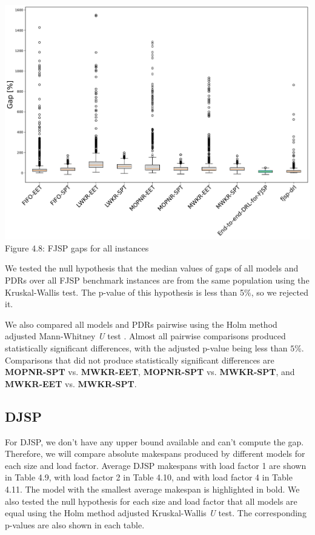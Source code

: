 \begin{center}
    \includegraphics[width=0.9\linewidth]{images/horizontal_boxplot_fjsp_all.pdf}\\
    Figure 4.8: FJSP gaps for all instances
\end{center}

We tested the null hypothesis that the median values of gaps of all models and PDRs over all FJSP benchmark instances are from the same population using the Kruskal-Wallis test. The p-value of this hypothesis is less than 5$\%$, so we rejected it. 
\par
We also compared all models and PDRs pairwise using the Holm method adjusted Mann-Whitney \textit{U} test \cite{mannwhitneyutest}. Almost all pairwise comparisons produced statistically significant differences, with the adjusted p-value being less than $5\%$. Comparisons that did not produce statistically significant differences are \textbf{MOPNR-SPT} vs. \textbf{MWKR-EET}, \textbf{MOPNR-SPT} vs. \textbf{MWKR-SPT}, and \textbf{MWKR-EET} vs. \textbf{MWKR-SPT}.

\subsection{DJSP}

For DJSP, we don't have any upper bound available and can't compute the gap. Therefore, we will compare absolute makespans produced by different models for each size and load factor. Average DJSP makespans with load factor 1 are shown in Table 4.9, with load factor 2 in Table 4.10, and with load factor 4 in Table 4.11. The model with the smallest average makespan is highlighted in bold. We also tested the null hypothesis for each size and load factor that all models are equal using the Holm method adjusted Kruskal-Wallis \textit{U} test. The corresponding p-values are also shown in each table.

